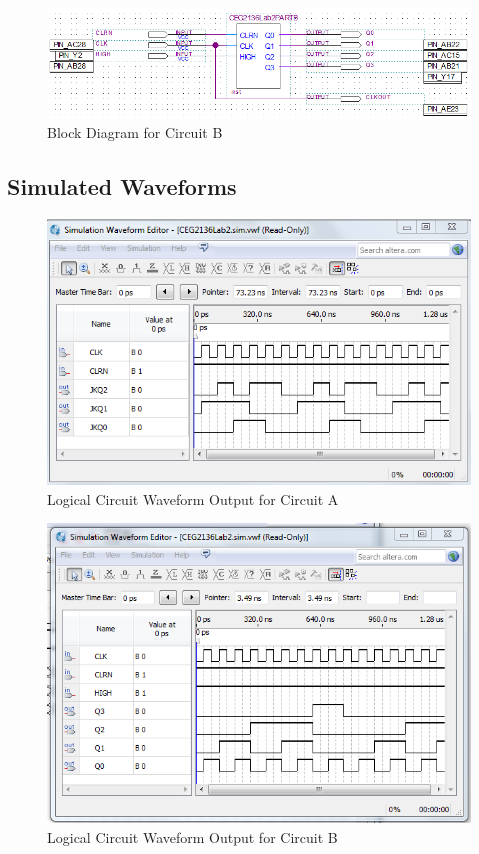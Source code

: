 \documentclass[a4paper,12pt]{article}
\begin{document}
\begin{figure}[H]
\includegraphics[width=\textwidth]{Images/LAB2_TestB.PNG} 
\caption{Block Diagram for Circuit B}
\label{fig:BlockDiagB}
\end{figure}


\subsection{Simulated Waveforms}

\begin{figure}[H]
\includegraphics[width=\textwidth]{Images/LAB2_WaveFormA.PNG} 
\caption{Logical Circuit Waveform Output for Circuit A}
\label{fig:WavA}
\end{figure}

\begin{figure}[H]
\includegraphics[width=\textwidth]{Images/LAB2_WaveFormB.PNG} 
\caption{Logical Circuit Waveform Output for Circuit B}
\label{fig:WavB}
\end{figure}
\end{document}
